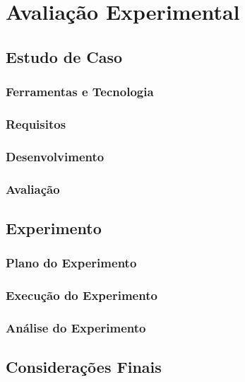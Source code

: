 \chapter{Avaliação Experimental}\label{cap:avalia}

\section{Estudo de Caso}

\subsection{Ferramentas e Tecnologia}
\subsection{Requisitos}
\subsection{Desenvolvimento}
\subsection{Avaliação}

\section{Experimento}

\subsection{Plano do Experimento}
\subsection{Execução do Experimento}
\subsection{Análise do Experimento}

\section{Considerações Finais}


